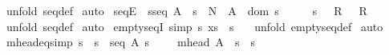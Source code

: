 \begin{isabellebody}
%
\isadelimproof
%
\endisadelimproof
%
\isatagproof
{}\isamarkupfalse%
\ {\isacharparenleft}unfold\ seq{\isacharunderscore}def{\isacharparenright}\isanewline
{}\isamarkupfalse%
\ auto\isanewline
{}\isamarkupfalse%
%
\endisatagproof
{\isafoldproof}%
%
\isadelimproof
\isanewline
%
\endisadelimproof
\isanewline
{}\isamarkupfalse%
\ seqE{\isacharcolon}\ {\isachardoublequoteopen}{\isacharbrackleft}{\isacharbar}\ s{\isacharcolon}seq\ A{\isacharsemicolon}\ {\isacharbrackleft}{\isacharbar}\ s\ {\isacharcolon}\ {\isacharpercent}N\ {\isacharminus}{\isacharbar}{\isacharbar}{\isacharminus}{\isachargreater}\ A\ {\isacharsemicolon}\ dom\ s\ {\isacharequal}\ {\isacharparenleft}\ {}\ {\isachardot}{\isachardot}\ {\isacharhash}\ s{\isacharparenright}\ {\isacharbar}{\isacharbrackright}\ {\isacharequal}{\isacharequal}{\isachargreater}\ R\ {\isacharbar}{\isacharbrackright}\ {\isacharequal}{\isacharequal}{\isachargreater}\ R{\isachardoublequoteclose}\isanewline
%
\isadelimproof
%
\endisadelimproof
%
\isatagproof
{}\isamarkupfalse%
\ {\isacharparenleft}unfold\ seq{\isacharunderscore}def{\isacharparenright}\isanewline
{}\isamarkupfalse%
\ auto\isanewline
{}\isamarkupfalse%
%
\endisatagproof
{\isafoldproof}%
%
\isadelimproof
\isanewline
%
\endisadelimproof
\isanewline
{}\isamarkupfalse%
\ emptyseqI\ {\isacharbrackleft}simp{\isacharbrackright}{\isacharcolon}\ {\isachardoublequoteopen}{\isacharbang}{\isacharbang}s{\isachardot}\ x{\isacharcolon}s\ {\isacharequal}{\isacharequal}{\isachargreater}\ s\ {\isachartilde}{\isacharequal}\ {\isacharpercent}{\isacharless}{\isacharpercent}{\isachargreater}{\isachardoublequoteclose}\isanewline
%
\isadelimproof
%
\endisadelimproof
%
\isatagproof
{}\isamarkupfalse%
\ {\isacharparenleft}unfold\ emptyseq{\isacharunderscore}def{\isacharparenright}\isanewline
{}\isamarkupfalse%
\ auto\isanewline
{}\isamarkupfalse%
%
\endisatagproof
{\isafoldproof}%
%
\isadelimproof
\isanewline
%
\endisadelimproof
\isanewline
{}\isamarkupfalse%
\ mhead{\isacharunderscore}eq{\isacharbrackleft}simp{\isacharbrackright}{\isacharcolon}\ {\isachardoublequoteopen}{\isacharbang}{\isacharbang}s{\isachardot}\ {\isacharbrackleft}{\isacharbar}\ s\ {\isacharcolon}\ seq\ A{\isacharsemicolon}\ s\ {\isachartilde}{\isacharequal}\ {\isacharpercent}{\isacharless}{\isacharpercent}{\isachargreater}\ {\isacharbar}{\isacharbrackright}\ {\isacharequal}{\isacharequal}{\isachargreater}\ mhead\ A\ {\isacharpercent}{\isacharcircum}\ s\ {\isacharequal}\ s{\isacharpercent}{\isacharcircum}{}{\isachardoublequoteclose}\isanewline

\end{isabellebody}
